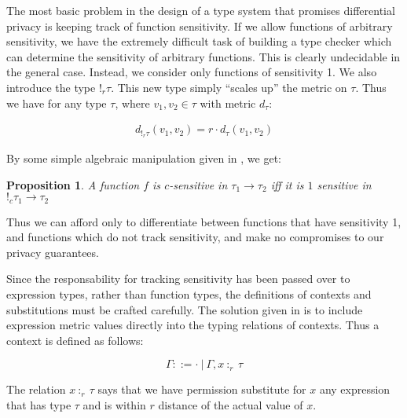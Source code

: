 \documentclass[11pt]{article}
\newtheorem{myprop}{Proposition}
\begin{document}
The most basic problem in the design of a type system that promises differential privacy is keeping track of function sensitivity. If we allow functions of arbitrary sensitivity, we have the extremely difficult task of building a type checker which can determine the sensitivity of arbitrary functions. This is clearly undecidable in the general case. Instead, we consider only functions of sensitivity 1. We also introduce the type $!_r \tau$. This new type simply ``scales up'' the metric on $\tau$. Thus we have for any type $\tau$, where $v_1,v_2 \in \tau$ with metric $d_\tau$:

\begin{align*}
  d_{!_r\tau}(v_1, v_2) = r \cdot d_{\tau}(v_1, v_2) 
\end{align*}

By some simple algebraic manipulation given in \cite{reed2010}, we get: \\
\begin{myprop} 
  A function $f$ is $c$-sensitive in $\tau_1 \rightarrow \tau_2$ iff it is $1$ sensitive in $!_c\tau_1 \rightarrow \tau_2$
\end{myprop}

Thus we can afford only to differentiate between functions that have sensitivity 1, and functions which do not track sensitivity, and make no compromises to our privacy guarantees.

Since the responsability for tracking sensitivity has been passed over to expression types, rather than function types, the definitions of contexts and substitutions must be crafted carefully. The solution given in \cite{reed2010} is to include expression metric values directly into the typing relations of contexts. Thus a context is defined as follows: 

$$ \Gamma ::= \cdot \ \vert \  \Gamma,x \ :_r \ \tau $$

The relation $x \ :_r \ \tau$ says that we have permission substitute for $x$ any expression that has type $\tau$ and is within $r$ distance of the actual value of $x$.







\end{document}
